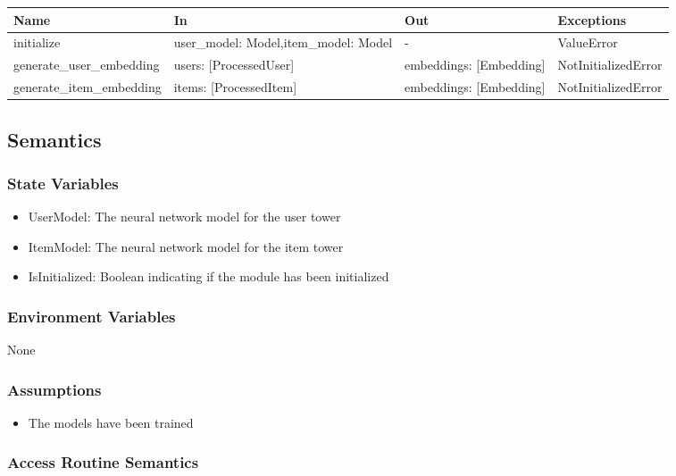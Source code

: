 \documentclass[12pt, titlepage]{article}
\begin{document}
\begin{center}
\begin{tabular}{p{5cm} p{4cm} p{4cm} p{3cm}}
\hline
\textbf{Name} & \textbf{In} & \textbf{Out} & \textbf{Exceptions} \\
\hline
initialize & user\_model: Model,item\_model: Model & - & ValueError \\
\hline
generate\_user\_embedding & users: [ProcessedUser] & embeddings: [Embedding] & NotInitializedError\\
\hline
generate\_item\_embedding & items: [ProcessedItem] & embeddings: [Embedding] & NotInitializedError\\
\hline
\end{tabular}
\end{center}

\subsection{Semantics}

\subsubsection{State Variables}
\begin{itemize}
  \item UserModel: The neural network model for the user tower
  \item ItemModel: The neural network model for the item tower
  \item IsInitialized: Boolean indicating if the module has been initialized
\end{itemize}

\subsubsection{Environment Variables}

None

\subsubsection{Assumptions}

\begin{itemize}
  \item The models have been trained
\end{itemize}

\subsubsection{Access Routine Semantics}
\end{document}
